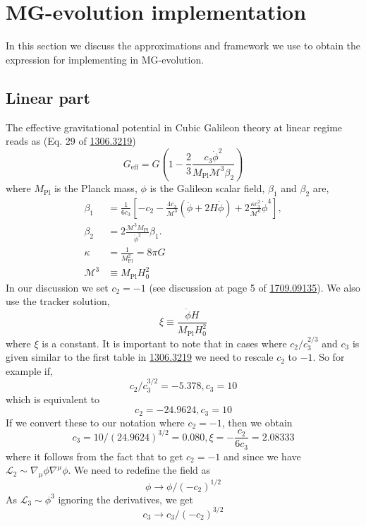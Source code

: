 \documentclass{article}
\def\be{\begin{equation}}
\def\ee{\end{equation}}
\begin{document}
\section{MG-evolution implementation}
In this section we discuss the approximations and framework we use to obtain the expression for implementing in MG-evolution.
\subsection{Linear part}
The effective gravitational potential in Cubic Galileon theory at linear regime reads as (Eq. 29 of \href{https://arxiv.org/abs/1306.3219}{1306.3219})
\be
G_{\mathrm{eff}}=G\left(1-\frac{2}{3} \frac{c_3 \dot{\phi}^2}{M_{\mathrm{Pl}} \mathcal{M}^3 \beta_2}\right)
\ee
where $M_{\mathrm{Pl}}$ is the Planck mass, $\phi$ is the Galileon scalar field, $\beta_1$ and $\beta_2$ are,
\begin{align*}
\beta_1 &= \frac{1}{6 c_3}\left[-c_2 - \frac{4 c_3}{\mathcal{M}^3}(\ddot{\phi}+2 H \dot{\phi}) + 2 \frac{\kappa c_3^2}{\mathcal{M}^6} \dot{\phi}^4\right], \\
\beta_2 &= 2 \frac{\mathcal{M}^3 M_{\mathrm{Pl}}}{\dot{\phi}^2} \beta_1. \\
\kappa &= \frac{1}{M_{\mathrm{Pl}}^2} = 8 \pi G \\
\mathcal{M}^3 & \equiv M_{\mathrm{Pl}} H_0^2
\end{align*}
In our discussion we set $c_2 = -1$ (see discussion at page 5 of \href{https://arxiv.org/pdf/1709.09135.pdf}{1709.09135}). We also use the tracker solution,
\be
\xi \equiv \frac{\dot{\phi} H}{M_{\mathrm{Pl}} H_0^2}
\ee
where $\xi$ is a constant. It is important to note that in cases where $c_2/c_3^{2/3}$ and $c_3$ is given similar to the first table in \href{https://arxiv.org/abs/1306.3219}{1306.3219} we need to rescale $c_2$ to $-1$. So for example if,
\be
 c_2/c_3^{3/2} = -5.378 , c_3 = 10
\ee
which is equivalent to 
\be
 c_2= -24.9624 , c_3 = 10
\ee
If we convert these to our notation where $c_2 = -1$, then we obtain 
\be
c_3 = 10/(24.9624)^{3/2} = 0.080, \xi = -\frac{c_2}{6 c_3 } = 2.08333
\ee
where it follows from the fact that to get $c_2 = -1$ and since we have $\mathcal{L}_2 \sim \nabla_{\mu} \phi \nabla^{\mu} \phi$. We need to redefine the field as
\be
 \phi \to \phi/(-c_2)^{1/2}
 \ee
 As $\mathcal{L}_3 \sim \phi^3$ ignoring the derivatives, we get
 \be 
 c_3 \to c_3/(-c_2)^{3/2}
 \ee
\end{document}
